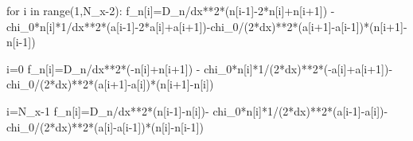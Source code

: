 \documentclass[
  letterpaper,
  DIV=11,
  numbers=noendperiod]{scrreprt}
\newenvironment{Shaded}{\begin{snugshade}}{\end{snugshade}}
\newcommand{\BuiltInTok}[1]{\textcolor[rgb]{0.00,0.23,0.31}{#1}}
\newcommand{\ControlFlowTok}[1]{\textcolor[rgb]{0.00,0.23,0.31}{#1}}
\newcommand{\DecValTok}[1]{\textcolor[rgb]{0.68,0.00,0.00}{#1}}
\newcommand{\KeywordTok}[1]{\textcolor[rgb]{0.00,0.23,0.31}{#1}}
\newcommand{\NormalTok}[1]{\textcolor[rgb]{0.00,0.23,0.31}{#1}}
\newcommand{\OperatorTok}[1]{\textcolor[rgb]{0.37,0.37,0.37}{#1}}
\theoremstyle{plain}
\theoremstyle{definition}
\theoremstyle{plain}
\theoremstyle{remark}
\begin{document}
\begin{Shaded}
\begin{Highlighting}[]
    \ControlFlowTok{for}\NormalTok{ i }\KeywordTok{in} \BuiltInTok{range}\NormalTok{(}\DecValTok{1}\NormalTok{,N\_x}\OperatorTok{{-}}\DecValTok{2}\NormalTok{):}
\NormalTok{      f\_n[i]}\OperatorTok{=}\NormalTok{D\_n}\OperatorTok{/}\NormalTok{dx}\OperatorTok{**}\DecValTok{2}\OperatorTok{*}\NormalTok{(n[i}\OperatorTok{{-}}\DecValTok{1}\NormalTok{]}\OperatorTok{{-}}\DecValTok{2}\OperatorTok{*}\NormalTok{n[i]}\OperatorTok{+}\NormalTok{n[i}\OperatorTok{+}\DecValTok{1}\NormalTok{]) }\OperatorTok{{-}}\NormalTok{ chi\_0}\OperatorTok{*}\NormalTok{n[i]}\OperatorTok{*}\DecValTok{1}\OperatorTok{/}\NormalTok{dx}\OperatorTok{**}\DecValTok{2}\OperatorTok{*}\NormalTok{(a[i}\OperatorTok{{-}}\DecValTok{1}\NormalTok{]}\OperatorTok{{-}}\DecValTok{2}\OperatorTok{*}\NormalTok{a[i]}\OperatorTok{+}\NormalTok{a[i}\OperatorTok{+}\DecValTok{1}\NormalTok{])}\OperatorTok{{-}}\NormalTok{chi\_0}\OperatorTok{/}\NormalTok{(}\DecValTok{2}\OperatorTok{*}\NormalTok{dx)}\OperatorTok{**}\DecValTok{2}\OperatorTok{*}\NormalTok{(a[i}\OperatorTok{+}\DecValTok{1}\NormalTok{]}\OperatorTok{{-}}\NormalTok{a[i}\OperatorTok{{-}}\DecValTok{1}\NormalTok{])}\OperatorTok{*}\NormalTok{(n[i}\OperatorTok{+}\DecValTok{1}\NormalTok{]}\OperatorTok{{-}}\NormalTok{n[i}\OperatorTok{{-}}\DecValTok{1}\NormalTok{])}

\NormalTok{    i}\OperatorTok{=}\DecValTok{0}
\NormalTok{    f\_n[i]}\OperatorTok{=}\NormalTok{D\_n}\OperatorTok{/}\NormalTok{dx}\OperatorTok{**}\DecValTok{2}\OperatorTok{*}\NormalTok{(}\OperatorTok{{-}}\NormalTok{n[i]}\OperatorTok{+}\NormalTok{n[i}\OperatorTok{+}\DecValTok{1}\NormalTok{]) }\OperatorTok{{-}}\NormalTok{ chi\_0}\OperatorTok{*}\NormalTok{n[i]}\OperatorTok{*}\DecValTok{1}\OperatorTok{/}\NormalTok{(}\DecValTok{2}\OperatorTok{*}\NormalTok{dx)}\OperatorTok{**}\DecValTok{2}\OperatorTok{*}\NormalTok{(}\OperatorTok{{-}}\NormalTok{a[i]}\OperatorTok{+}\NormalTok{a[i}\OperatorTok{+}\DecValTok{1}\NormalTok{])}\OperatorTok{{-}}\NormalTok{chi\_0}\OperatorTok{/}\NormalTok{(}\DecValTok{2}\OperatorTok{*}\NormalTok{dx)}\OperatorTok{**}\DecValTok{2}\OperatorTok{*}\NormalTok{(a[i}\OperatorTok{+}\DecValTok{1}\NormalTok{]}\OperatorTok{{-}}\NormalTok{a[i])}\OperatorTok{*}\NormalTok{(n[i}\OperatorTok{+}\DecValTok{1}\NormalTok{]}\OperatorTok{{-}}\NormalTok{n[i])}

\NormalTok{    i}\OperatorTok{=}\NormalTok{N\_x}\OperatorTok{{-}}\DecValTok{1}
\NormalTok{    f\_n[i]}\OperatorTok{=}\NormalTok{D\_n}\OperatorTok{/}\NormalTok{dx}\OperatorTok{**}\DecValTok{2}\OperatorTok{*}\NormalTok{(n[i}\OperatorTok{{-}}\DecValTok{1}\NormalTok{]}\OperatorTok{{-}}\NormalTok{n[i])}\OperatorTok{{-}}\NormalTok{ chi\_0}\OperatorTok{*}\NormalTok{n[i]}\OperatorTok{*}\DecValTok{1}\OperatorTok{/}\NormalTok{(}\DecValTok{2}\OperatorTok{*}\NormalTok{dx)}\OperatorTok{**}\DecValTok{2}\OperatorTok{*}\NormalTok{(a[i}\OperatorTok{{-}}\DecValTok{1}\NormalTok{]}\OperatorTok{{-}}\NormalTok{a[i])}\OperatorTok{{-}}\NormalTok{chi\_0}\OperatorTok{/}\NormalTok{(}\DecValTok{2}\OperatorTok{*}\NormalTok{dx)}\OperatorTok{**}\DecValTok{2}\OperatorTok{*}\NormalTok{(a[i]}\OperatorTok{{-}}\NormalTok{a[i}\OperatorTok{{-}}\DecValTok{1}\NormalTok{])}\OperatorTok{*}\NormalTok{(n[i]}\OperatorTok{{-}}\NormalTok{n[i}\OperatorTok{{-}}\DecValTok{1}\NormalTok{])}



\end{Highlighting}
\end{Shaded}
\end{document}

